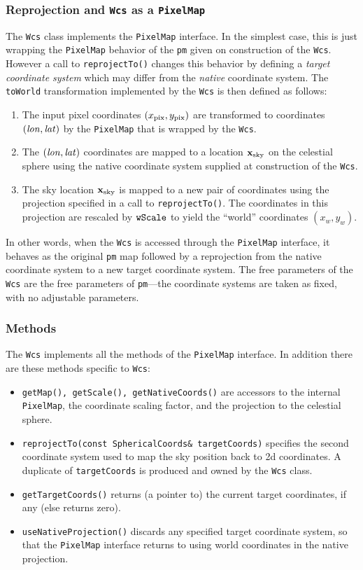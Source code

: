 \documentclass[11pt,preprint,flushrt]{aastex}
\begin{document}
\subsubsection{Reprojection and {\tt Wcs} as a {\tt PixelMap}}
The {\tt Wcs} class implements the {\tt PixelMap} interface. In the simplest case, this is just wrapping the {\tt PixelMap} behavior of the {\tt pm} given on construction of the {\tt Wcs}.  However a call to {\tt reprojectTo()} changes this behavior
 by defining a {\em target coordinate system} which may differ from the {\em native} coordinate system.  The {\tt toWorld} transformation implemented by the {\tt Wcs} is then defined as follows:
\begin{enumerate}
\item The input pixel coordinates $(x_{\rm pix},y_{\rm pix})$ are transformed to coordinates $({\it lon},{\it lat})$ by the {\tt PixelMap} that is wrapped by the {\tt Wcs}.
\item The $({\it lon},{\it lat})$ coordinates are mapped to a location ${\bf x}_{\rm sky}$ on the celestial sphere using the native coordinate system supplied at construction of the {\tt Wcs}.
\item The sky location ${\bf x}_{\rm sky}$ is mapped to a new pair of coordinates using the projection specified in a call to {\tt reprojectTo()}.  The coordinates in this projection are rescaled by ${\tt wScale}$ to yield the ``world'' coordinates $(x_w,y_w)$.
\end{enumerate}
In other words, when the {\tt Wcs} is accessed through the {\tt PixelMap} interface, it behaves as the original {\tt pm} map followed by a reprojection from the native coordinate system to a new target coordinate system.  The free parameters of the {\tt Wcs} are the free parameters of {\tt pm}---the coordinate systems are taken as fixed, with no adjustable parameters.

\subsubsection{Methods}
The {\tt Wcs} implements all the methods of the {\tt PixelMap} interface.  In addition there are these methods specific to {\tt Wcs}:
\begin{itemize}
\item {\tt getMap(), getScale(), getNativeCoords()} are accessors to the internal {\tt PixelMap}, the coordinate scaling factor, and the projection to the celestial sphere.
\item {\tt reprojectTo(const SphericalCoords\& targetCoords)} specifies the second coordinate system used to map the sky position back to 2d coordinates.  A duplicate of {\tt targetCoords} is produced and owned by the {\tt Wcs} class.
\item {\tt getTargetCoords()} returns (a pointer to) the current target coordinates, if any (else returns zero).
\item {\tt useNativeProjection()} discards any specified target coordinate system, so that the {\tt PixelMap} interface returns to using world coordinates in the native projection.
\end{itemize}
\end{document}
